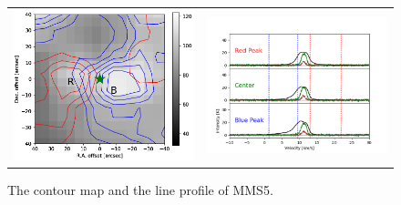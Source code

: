 \begin{figure}[h!]
	\begin{center}
		\begin{tabular}{cc}
			\includegraphics[width=7cm]{Orion_12CO2-1_MMS5_rbcontour_400_modified.png} &   \includegraphics[width=7cm]{Orion_12CO2-1_MMS5_line_profile_400.png} \\
		\end{tabular}
		\label{MMS521}
		\caption{The contour map and the line profile of MMS5. }
	\end{center}
\end{figure}
\clearpage
\newpage
